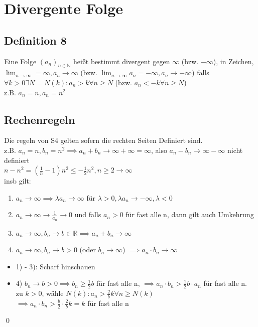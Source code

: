 \documentclass[fleqn]{scrbook}
\newcommand{\R}{\mathbb{R}}
\newcommand{\N}{\mathbb{N}}
\renewenvironment{proof}{{\bfseries Beweis }}{\qed}
\begin{document}
\section{Divergente Folge}
\subsection{Definition 8} Eine Folge $(a_n)_{n \in \N}$ heißt bestimmt divergent gegen $\infty$ (bzw. $-\infty$), in Zeichen, $\lim_{n\rightarrow \infty} = \infty, a_n \rightarrow \infty$ (bzw. $\lim_{n\rightarrow\infty} a_n = - \infty , a_n \rightarrow - \infty$) falls $\forall k > 0 \exists N = N(k): a_n > k \forall n \geq N$ (bzw. $a_n < -k \forall n \geq N$)\\
z.B. $a_n = n, a_n = n^2$
\subsection{Rechenregeln} Die regeln von S4 gelten sofern die rechten Seiten Definiert sind.\\
z.B. $a_n = n, b_n = n^2 \implies a_n + b_n \rightarrow \infty + \infty = \infty$, also $a_n - b_n \rightarrow \infty - \infty$ nicht definiert\\
$n - n^2 = (\frac{1}{n} - 1) n^2 \leq -\frac{1}{2}n^2, n\geq 2 \rightarrow \infty$\\
insb gilt:
\begin{enumerate}[1)]
\item $a_n \rightarrow \infty \implies \lambda a_n \rightarrow \infty$ für $\lambda > 0, \lambda a_n \rightarrow - \infty, \lambda < 0$
\item $a_n \rightarrow \infty \rightarrow \frac{1}{a_n} \rightarrow 0$ und falls $a_n > 0$ für fast alle n, dann gilt auch Umkehrung
\item $a_n \rightarrow \infty, b_n \rightarrow b \in \R \implies a_n + b_n \rightarrow \infty$
\item $a_n \rightarrow \infty, b_n \rightarrow b > 0$ (oder $b_n \rightarrow \infty$) $\implies a_n  \cdot  b_n \rightarrow \infty$
\end{enumerate}
\begin{proof}
\begin{itemize}
\item 1) - 3): Scharf hinschauen
\item 4) $b_n \rightarrow b > 0 \implies b_n \geq \frac{1}{2} b$ für fast alle n, $\implies a_n  \cdot  b_n > \frac{1}{2}b \cdot a_n$ für fast alle n.\\zu $k > 0$, wähle $N(k): a_n > \frac{2}{b}k \forall n\geq N(k)$\\$\implies a_n  \cdot  b_n > \frac{b}{2}  \cdot  \frac{2}{b} k = k$ für fast alle n
\end{itemize}
\end{proof}
\end{document}
